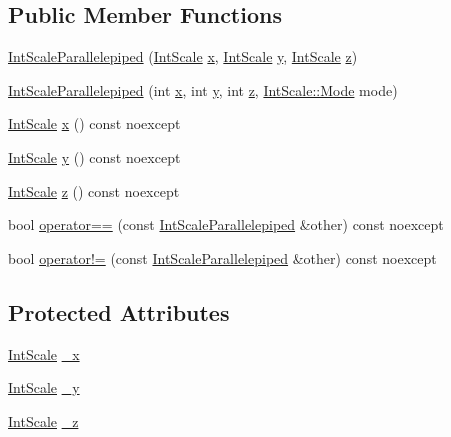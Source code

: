 \subsection*{Public Member Functions}
\begin{DoxyCompactItemize}
\item 
\hyperlink{struct_int_scale_parallelepiped_ad3fb65abb48a7e209d232a5c9f0833df}{Int\-Scale\-Parallelepiped} (\hyperlink{struct_int_scale}{Int\-Scale} \hyperlink{struct_int_scale_parallelepiped_ad6a3f505f9f24e4cbd160767935dbc8f}{x}, \hyperlink{struct_int_scale}{Int\-Scale} \hyperlink{struct_int_scale_parallelepiped_a417b098653c51f84fcb2b330f3a835a2}{y}, \hyperlink{struct_int_scale}{Int\-Scale} \hyperlink{struct_int_scale_parallelepiped_a464fa29bb3540786b028ec12c954c6f4}{z})
\item 
\hyperlink{struct_int_scale_parallelepiped_ac758a9b77c5519d7bdf069dd166c6c94}{Int\-Scale\-Parallelepiped} (int \hyperlink{struct_int_scale_parallelepiped_ad6a3f505f9f24e4cbd160767935dbc8f}{x}, int \hyperlink{struct_int_scale_parallelepiped_a417b098653c51f84fcb2b330f3a835a2}{y}, int \hyperlink{struct_int_scale_parallelepiped_a464fa29bb3540786b028ec12c954c6f4}{z}, \hyperlink{struct_int_scale_ab7d4e812b60cd562ddc4fb120ff1f0cc}{Int\-Scale\-::\-Mode} mode)
\item 
\hyperlink{struct_int_scale}{Int\-Scale} \hyperlink{struct_int_scale_parallelepiped_ad6a3f505f9f24e4cbd160767935dbc8f}{x} () const noexcept
\item 
\hyperlink{struct_int_scale}{Int\-Scale} \hyperlink{struct_int_scale_parallelepiped_a417b098653c51f84fcb2b330f3a835a2}{y} () const noexcept
\item 
\hyperlink{struct_int_scale}{Int\-Scale} \hyperlink{struct_int_scale_parallelepiped_a464fa29bb3540786b028ec12c954c6f4}{z} () const noexcept
\item 
bool \hyperlink{struct_int_scale_parallelepiped_a4e119e47ddb3762e1bf84f730d42c54d}{operator==} (const \hyperlink{struct_int_scale_parallelepiped}{Int\-Scale\-Parallelepiped} \&other) const noexcept
\item 
bool \hyperlink{struct_int_scale_parallelepiped_a158a2224393b77919b7fac50237b3df9}{operator!=} (const \hyperlink{struct_int_scale_parallelepiped}{Int\-Scale\-Parallelepiped} \&other) const noexcept
\end{DoxyCompactItemize}
\subsection*{Protected Attributes}
\begin{DoxyCompactItemize}
\item 
\hyperlink{struct_int_scale}{Int\-Scale} \hyperlink{struct_int_scale_parallelepiped_a81ba3ef17d50475ba400ecae4f45a528}{\-\_\-x}
\item 
\hyperlink{struct_int_scale}{Int\-Scale} \hyperlink{struct_int_scale_parallelepiped_a42cea4ad40c67c30fc3647b4260c8a44}{\-\_\-y}
\item 
\hyperlink{struct_int_scale}{Int\-Scale} \hyperlink{struct_int_scale_parallelepiped_a613558e63f3ecc557cc086d8ddb17d30}{\-\_\-z}
\end{DoxyCompactItemize}



